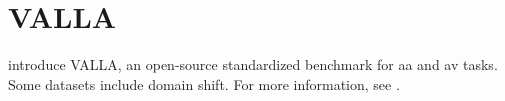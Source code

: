 \section{VALLA}
\label{sec:valla}

\citet{tyo_state_2022} introduce VALLA, an open-source standardized benchmark for \ac{aa} and \ac{av} tasks.
Some datasets include domain shift.
For more information, see \citep{tyo_state_2022}.